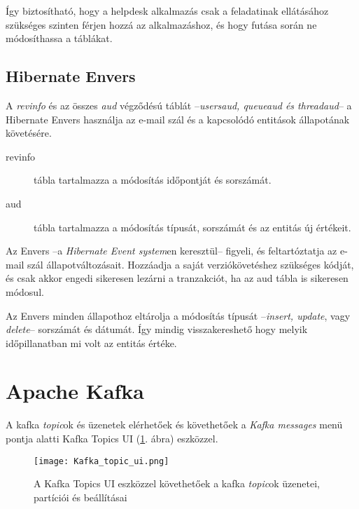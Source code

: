 Így biztosítható, hogy a helpdesk alkalmazás csak a feladatinak ellátásához szükséges szinten férjen hozzá az alkalmazáshoz, és hogy futása során ne módosíthassa a táblákat. 


\subsection{Hibernate Envers}\label{sec:hubernate_envers}
A \textit{revinfo} és az összes \textit{\textunderscore aud} végződésú táblát --\textit{\mbox{users\textunderscore aud}, \mbox{queue\textunderscore aud} és \mbox{thread\textunderscore aud}}-- a Hibernate Envers használja az e-mail szál és a kapcsolódó entitások állapotának követésére.

\begin{description}
	\item[revinfo] tábla tartalmazza a módosítás időpontját és sorszámát.
	
	\item[\textunderscore aud] tábla tartalmazza a módosítás típusát, sorszámát és az entitás új értékeit.
\end{description}

Az Envers --a \textit{Hibernate Event system}en keresztül-- figyeli, és feltartóztatja az e-mail szál állapotváltozásait. Hozzáadja a saját verziókövetéshez szükséges kódját, és csak akkor engedi sikeresen lezárni a tranzakciót, ha az \textunderscore aud tábla is sikeresen módosul.

Az Envers minden állapothoz eltárolja a módosítás típusát --\textit{insert, update}, vagy \textit{delete}-- sorszámát és dátumát. Így mindig visszakereshető hogy melyik időpillanatban mi volt az entitás értéke.



\section{Apache Kafka}\label{sec:kafka_topics}
A kafka \textit{topic}ok és üzenetek elérhetőek és követhetőek a \textit{Kafka messages} menü pontja alatti Kafka Topics UI (\ref{fig:Kafka_Topics_UI}. ábra) eszközzel.

\begin{figure}[hbt] 
	\centering
	\texttt{[image: Kafka\_topic\_ui.png]}
	\caption[A Kafka Topics UI felülete]{A Kafka Topics UI eszközzel követhetőek a kafka \textit{topic}ok üzenetei, partíciói és beállításai}
	\label{fig:Kafka_Topics_UI}
\end{figure}


